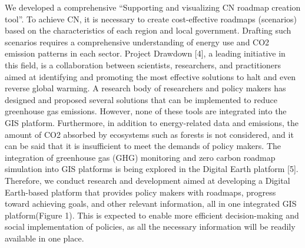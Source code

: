 We developed a comprehensive “Supporting and visualizing CN roadmap creation tool”. To achieve CN, it is necessary to create cost-effective roadmaps (scenarios) based on the characteristics of each region and local government. Drafting such scenarios requires a comprehensive understanding of energy use and CO2 emission patterns in each sector. Project Drawdown [4], a leading initiative in this field, is a collaboration between scientists, researchers, and practitioners aimed at identifying and promoting the most effective solutions to halt and even reverse global warming. A research body of researchers and policy makers has designed and proposed several solutions that can be implemented to reduce greenhouse gas emissions. However, none of these tools are integrated into the GIS 
platform. Furthermore, in addition to energy-related data and emissions, the amount of CO2 absorbed by ecosystems 
such as forests is not considered, and it can be said that it is insufficient to meet the demands of policy makers. The 
integration of greenhouse gas (GHG) monitoring and zero carbon roadmap simulation into GIS platforms is being 
explored in the Digital Earth platform [5]. Therefore, we conduct research and development aimed at developing a 
Digital Earth-based platform that provides policy makers with roadmaps, progress toward achieving goals, and other 
relevant information, all in one integrated GIS platform(Figure 1). This is expected to enable more efficient 
decision-making and social implementation of policies, as all the necessary information will be readily available in 
one place.\par


